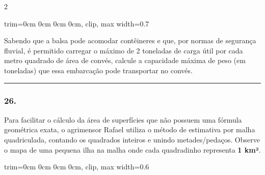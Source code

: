 \documentclass[twoside, 10pt, a4paper]{article}
\newlength{\espacoPreQuestao}\setlength{\espacoPreQuestao}{0.1cm}
\newlength{\espacoQuestao}\setlength{\espacoQuestao}{0.2cm}
\begin{document}
\begin{multicols*}{2}
\begin{center}
\begin{adjustbox}{trim=0cm 0cm 0cm 0cm, clip, max width=0.7\linewidth}
\end{adjustbox}
\end{center}

Sabendo que a balsa pode acomodar contêineres e que, por normas de segurança fluvial, é permitido carregar o máximo de 2 toneladas de carga útil por cada metro quadrado de área de convés, calcule a capacidade máxima de peso (em toneladas) que essa embarcação pode transportar no convés.
\par\vspace{\espacoQuestao}

\noindent\textcolor{CorLinha}{\rule{\linewidth}{0.5pt}} 
\par\vspace{\espacoPreQuestao}
\subsubsection*{26.} Para facilitar o cálculo da área de superfícies que não possuem uma fórmula geométrica exata, o agrimensor Rafael utiliza o método de estimativa por malha quadriculada, contando os quadrados inteiros e unindo metades/pedaços. Observe o mapa de uma pequena ilha na malha onde cada quadradinho representa \textbf{1 km²}.

\begin{center}
\begin{adjustbox}{trim=0cm 0cm 0cm 0cm, clip, max width=0.6\linewidth}
\end{adjustbox}
\end{center}


\end{multicols*}
\end{document}
